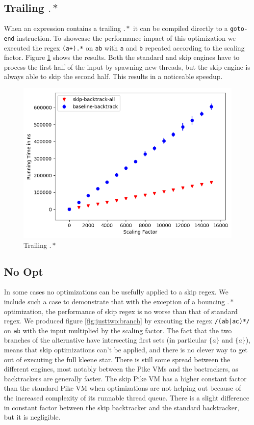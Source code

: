 \subsection{Trailing $.*$}

When an expression contains a trailing $.*$ it can be compiled
directly to a \verb'goto-end' instruction. To showcase the
performance impact of this optimization we executed the
regex \verb'(a+).*' on \verb'ab' with \verb'a' and \verb'b'
repeated according to the scaling factor. Figure
\ref{fig:aplus:trailing} shows the results. Both the standard
and skip engines have to process the first half of the input
by spawning new threads, but the skip engine is always able
to skip the second half. This results in a noticeable speedup.

\begin{figure}
\caption{Trailing $.*$}
\label{fig:aplus:trailing}

\includegraphics{resources/aplus-trailing.png}
\end{figure}

\subsection{No Opt}

In some cases no optimizations can be usefully applied to a skip
regex. We include such a case to demonstrate that with the exception
of a bouncing $.*$ optimization, the performance of skip regex is
no worse than that of standard regex. We produced figure 
\ref{fig:justtwo:branch}
by executing the regex \verb'/(ab|ac)*/' on \verb'ab' with
the input multiplied by the scaling factor. The fact that the
two branches of the alternative have intersecting first sets
(in particular $\{a\}$ and $\{a\}$), means that skip optimizations
can't be applied, and there is no clever way to get out of
executing the full kleene star. There is still some spread between
the different engines, most notably between the Pike VMs and the
bactrackers, as backtrackers are generally faster. The skip Pike VM
has a higher constant factor than the standard Pike VM when optimizations
are not helping out because of the increased complexity of its runnable
thread queue. There is a slight difference in constant factor between
the skip backtracker and the standard backtracker, but it is negligible.

